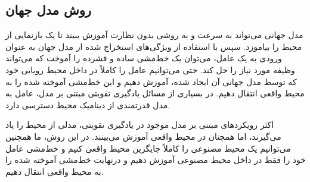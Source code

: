 \subsection{روش مدل جهان}
مدل جهانی
 می‌تواند به سرعت و به روشی بدون نظارت آموزش ببیند تا یک بازنمایی از محیط را بیاموزد. سپس با استفاده از ویژگی‌های استخراج شده از مدل جهان به عنوان ورودی به یک عامل، می‌توان یک خط‌مشی ساده و فشرده را آموخت که می‌تواند وظیفه مورد نیاز را حل کند. حتی می‌توانیم عامل را کاملاً در داخل محیط رویایی خود که توسط مدل جهانی آن ایجاد شده، آموزش دهیم و این خط‌مشی آموخته شده را به محیط واقعی انتقال دهیم. در بسیاری از مسائل یادگیری تقویتی مبتنی بر مدل، عامل به مدل قدرتمندی از دینامیک محیط دسترسی دارد.


اکثر رویکردهای مبتنی بر مدل موجود در یادگیری تقویتی، مدلی از محیط را یاد می‌گیرند، اما همچنان در محیط واقعی آموزش می‌بینند. در این روش، ما همچنین می‌توانیم یک محیط  مصنوعی را کاملاً جایگزین محیط واقعی کنیم و خط‌مشی عامل خود را فقط در داخل محیط مصنوعی آموزش دهیم و درنهایت خط‌مشی آموخته شده را به محیط واقعی انتقال دهیم.

